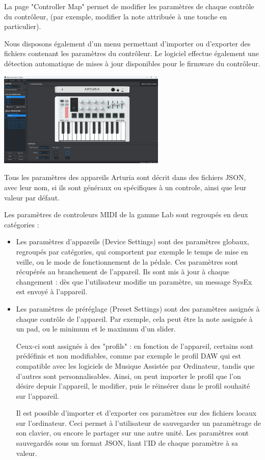 \documentclass[francais]{rapportPFE}  %
\begin{document}
La page "Controller Map" permet de modifier les paramètres de chaque contrôle du contrôleur, (par exemple, modifier la note attribuée à une touche en particulier).

Nous disposons également d'un menu permettant d'importer ou d'exporter des fichiers contenant les paramètres du contrôleur. Le logiciel effectue également une détection automatique de mises à jour disponibles pour le firmware du contrôleur. 

\begin{center}
	\centering
	\includegraphics[width=0.6\textwidth]{graphics/mcc_existant.png}
	\begin{tiny}
	\end{tiny}
	\label{fig}
\end{center}

Tous les paramètres des appareils Arturia sont décrit dans des fichiers JSON, avec leur nom, si ils sont généraux ou spécifiques à un controle, ainsi que leur valeur par défaut. 

Les paramètres de controleurs MIDI de la gamme Lab sont regroupés en deux catégories :
\begin{itemize}
    \item Les paramètres d'appareils (Device Settings) sont des paramètres globaux, regroupés par catégories, qui comportent par exemple le temps de mise en veille, ou le mode de fonctionnement de la pédale. Ces paramètres sont récupérés au branchement de l'appareil. Ils sont mis à jour à chaque changement : dès que l'utilisateur modifie un paramètre, un message SysEx est envoyé à l'appareil.
    \item Les paramètres de préréglage (Preset Settings) sont des paramètres assignés à chaque contrôle de l'appareil. Par exemple, cela peut être la note assignée à un pad, ou le minimum et le maximum d'un slider. 
    
    Ceux-ci sont assignés à des "profils" : en fonction de l'appareil, certains sont prédéfinis et non modifiables, comme par exemple le profil DAW qui est compatible avec les logiciels de Musique Assistée par Ordinateur, tandis que d'autres sont personnalisables. Ainsi, on peut importer le profil que l'on désire depuis l'appareil, le modifier, puis le réinsérer dans le profil souhaité sur l'appareil. 

    Il est possible d'importer et d'exporter ces paramètres sur des fichiers locaux sur l'ordinateur. Ceci permet à l'utilisateur de sauvegarder un paramètrage de son clavier, ou encore le partager sur une autre unité. Les paramètres sont sauvegardés sous un format JSON, liant l'ID de chaque paramètre à sa valeur.
\end{itemize}
\end{document}
